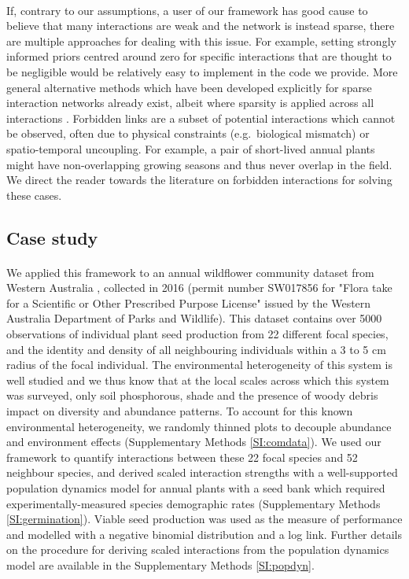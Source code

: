 \documentclass[a4,12pt]{article}
\begin{document}
\begin{refsection}
        \paragraph{}
        If, contrary to our assumptions, a user of our framework has good cause to believe that many interactions are weak and the network is instead sparse, there are multiple approaches for dealing with this issue. For example, setting strongly informed priors centred around zero for specific interactions that are thought to be negligible would be relatively easy to implement in the code we provide. More general alternative methods which have been developed explicitly for sparse interaction networks already exist, albeit where sparsity is applied across all interactions \parencite{Weiss-Lehman2022}. Forbidden links are a subset of potential interactions which cannot be observed, often due to physical constraints (e.g.\ biological mismatch) or spatio-temporal uncoupling. For example, a pair of short-lived annual plants might have non-overlapping growing seasons and thus never overlap in the field. We direct the reader towards the literature on forbidden interactions \parencite{Olesen2011, Jordano2016} for solving these cases. 

    \subsection{Case study}

       \paragraph{}
        We applied this framework to an annual wildflower community dataset from Western Australia \parencite{Bimler2023}, collected in 2016 (permit number SW017856 for "Flora take for a Scientific or Other Prescribed Purpose License" issued by the Western Australia Department of Parks and Wildlife). This dataset contains over 5000 observations of individual plant seed production from 22 different focal species, and the identity and density of all neighbouring individuals within a 3 to 5 cm radius of the focal individual. The environmental heterogeneity of this system is well studied \parencite{Dwyer2015} and we thus know that at the local scales across which this system was surveyed, only soil phosphorous, shade and the presence of woody debris impact on diversity and abundance patterns. To account for this known environmental heterogeneity, we randomly thinned plots to decouple abundance and environment effects (Supplementary Methods \ref{SI:comdata}). We used our framework to quantify interactions between these 22 focal species and 52 neighbour species, and derived scaled interaction strengths with a well-supported population dynamics model for annual plants with a seed bank \parencite{Levine2009, Bimler2018} which required experimentally-measured species demographic rates (Supplementary Methods \ref{SI:germination}). Viable seed production was used as the measure of performance and modelled with a negative binomial distribution and a log link. Further details on the procedure for deriving scaled interactions from the population dynamics model are available in the Supplementary Methods \ref{SI:popdyn}.


\end{refsection}
\end{document}
